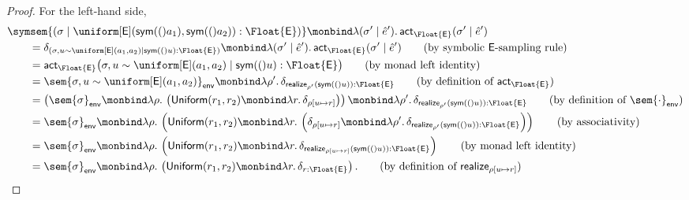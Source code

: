 \begin{proof}
For the left-hand side,
\begin{align}
  &\symsem{
    (\sigma \mid
    \uniform[\E](\sym(a_1),\sym(a_2)):\Float{\E})
  }
  \monbind
  \lambda(\sigma' \mid \hat e').\,
  \mathsf{act}_{\Float{\E}}(\sigma' \mid \hat e')
  \notag
  \\
  &\qquad=
  \delta_{
    (\sigma,u\sim\uniform[\E](a_1,a_2)
    \mid \sym(u):\Float{\E})
  }
  \monbind
  \lambda(\sigma' \mid \hat e').\,
  \mathsf{act}_{\Float{\E}}(\sigma' \mid \hat e')
  \tag{\text{by symbolic $\E$-sampling rule}}
  \\
  &\qquad=
  \mathsf{act}_{\Float{\E}}
  \bigl(
    \sigma,u\sim\uniform[\E](a_1,a_2)
    \mid \sym(u):\Float{\E}
  \bigr)
  \tag{\text{by monad left identity}}
  \\
  &\qquad=
  \sem{\sigma,u\sim\uniform[\E](a_1,a_2)}_{\mathsf{env}}
  \monbind
  \lambda\rho'.\,
  \delta_{\mathsf{realize}_{\rho'}(\sym(u)):\Float{\E}}
  \tag{\text{by definition of $\mathsf{act}_{\Float{\E}}$}}
  \\
  &\qquad=
  \left(
    \sem{\sigma}_{\mathsf{env}}
    \monbind
    \lambda\rho.\,
    \left(
      \mathsf{Uniform}(r_1,r_2)
      \monbind
      \lambda r.\,
      \delta_{\rho[u\mapsto r]}
    \right)
  \right)
  \monbind
  \lambda\rho'.\,
  \delta_{\mathsf{realize}_{\rho'}(\sym(u)):\Float{\E}}
  \tag{\text{by definition of $\sem{\cdot}_{\mathsf{env}}$}}
  \\
  &\qquad=
  \sem{\sigma}_{\mathsf{env}}
  \monbind
  \lambda\rho.\,
  \left(
    \mathsf{Uniform}(r_1,r_2)
    \monbind
    \lambda r.\,
    \left(
      \delta_{\rho[u\mapsto r]}
      \monbind
      \lambda\rho'.\,
      \delta_{\mathsf{realize}_{\rho'}(\sym(u)):\Float{\E}}
    \right)
  \right)
  \tag{\text{by associativity}}
  \\
  &\qquad=
  \sem{\sigma}_{\mathsf{env}}
  \monbind
  \lambda\rho.\,
  \left(
    \mathsf{Uniform}(r_1,r_2)
    \monbind
    \lambda r.\,
    \delta_{\mathsf{realize}_{\rho[u\mapsto r]}(\sym(u)):\Float{\E}}
  \right)
  \tag{\text{by monad left identity}}
  \\
  &\qquad=
  \sem{\sigma}_{\mathsf{env}}
  \monbind
  \lambda\rho.\,
  \left(
    \mathsf{Uniform}(r_1,r_2)
    \monbind
    \lambda r.\,
    \delta_{r:\Float{\E}}
  \right).
  \tag{\text{by definition of $\mathsf{realize}_{\rho[u\mapsto r]}$}}
\end{align}


\end{proof}
